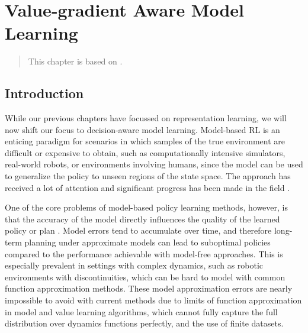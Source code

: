\chapter{Value-gradient Aware Model Learning}
\label{chap:vagram}

\begin{quote}
    This chapter is based on .
\end{quote}

\section{Introduction}
While our previous chapters have focussed on representation learning, we will now shift our focus to decision-aware model learning.
Model-based RL is an enticing paradigm for scenarios in which samples of the true environment are difficult or expensive to obtain, such as computationally intensive simulators, real-world robots, or environments involving humans, since the model can be used to generalize the policy to unseen regions of the state space. 
The approach has received a lot of attention and significant progress has been made in the field \parencite{dyna,deisenroth2011pilco,levine2013guided,hafner2020dream,moerland,schrittwieser2020mastering}.

One of the core problems of model-based policy learning methods, however, is that the accuracy of the model directly influences the quality of the learned policy or plan \parencite{schneider1997exploiting,kearns2002near,ross2012agnostic,talvitie2017self,luo2018algorithmic,janner2019mbpo}. 
Model errors tend to accumulate over time, and therefore long-term planning under approximate models can lead to suboptimal policies compared to the performance achievable with model-free approaches.
This is especially prevalent in settings with complex dynamics, such as robotic environments with discontinuities, which can be hard to model with common function approximation methods.
These model approximation errors are nearly impossible to avoid with current methods due to limits of function approximation in model and value learning algorithms, which cannot fully capture the full distribution over dynamics functions perfectly, and the use of finite datasets.

